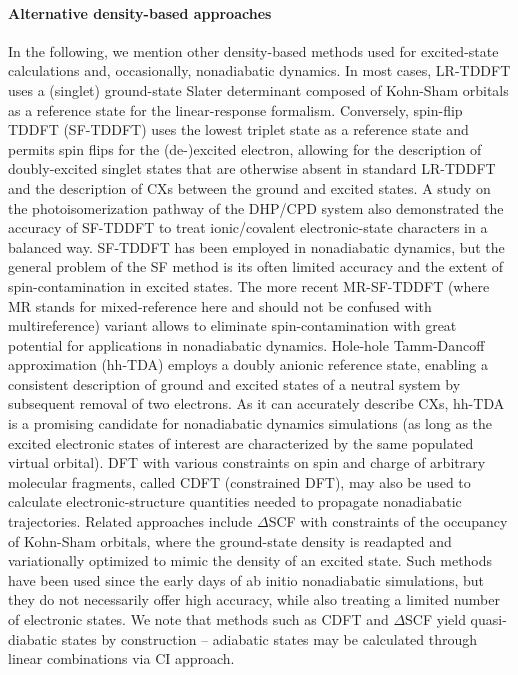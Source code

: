 \documentclass[9pt,bestpractices,pubversion]{livecoms}
\begin{document}
\paragraph{Alternative density-based approaches}
In the following, we mention other density-based methods used for excited-state calculations and, occasionally, nonadiabatic dynamics. In most cases, LR-TDDFT uses a (singlet) ground-state Slater determinant composed of Kohn-Sham orbitals as a reference state for the linear-response formalism. Conversely, spin-flip TDDFT (SF-TDDFT)\cite{herbert2022spin} uses the lowest triplet state as a reference state and permits spin flips for the (de-)excited electron, allowing for the description of doubly-excited singlet states that are otherwise absent in standard LR-TDDFT and the description of CXs between the ground and excited states.\cite{winslow2020sftddftcxs} A study on the photoisomerization pathway of the DHP/CPD system also demonstrated the accuracy of SF-TDDFT to treat ionic/covalent electronic-state characters in a balanced way.\cite{lognon2023sftddft} SF-TDDFT has been employed in nonadiabatic dynamics,\cite{minezawa2019trajectory,yue2018performance} but the general problem of the SF method is its often limited accuracy and the extent of spin-contamination in excited states. The more recent MR-SF-TDDFT\cite{lee2018eliminating} (where MR stands for mixed-reference here and should not be confused with multireference) variant allows to eliminate spin-contamination with great potential for applications in nonadiabatic dynamics.\cite{lee2025expanding}  Hole-hole Tamm-Dancoff approximation (hh-TDA) employs a doubly anionic reference state, enabling a consistent description of ground and excited states of a neutral system by subsequent removal of two electrons.\cite{bannwarth_holehole_2020} As it can accurately describe CXs, hh-TDA is a promising candidate for nonadiabatic dynamics simulations (as long as the excited electronic states of interest are characterized by the same populated virtual orbital).\cite{yu_ab_2020}
DFT with various constraints on spin and charge of arbitrary molecular fragments, called CDFT (constrained DFT),\cite{kaduk2012constrained} may also be used to calculate electronic-structure quantities needed to propagate nonadiabatic trajectories\cite{krenz2020photochemical}. Related approaches include $\Delta$SCF with constraints of the occupancy of Kohn-Sham orbitals, where the ground-state density is readapted and variationally optimized to mimic the density of an excited state.\cite{kaduk2012constrained,vandaele2022deltascf} Such methods have been used since the early days of ab initio nonadiabatic simulations,\cite{doltsinis02b} but they do not necessarily offer high accuracy, while also treating a limited number of electronic states. We note that methods such as CDFT and $\Delta$SCF yield quasi-diabatic states by construction -- adiabatic states may be calculated through linear combinations via CI approach. 
\end{document}
